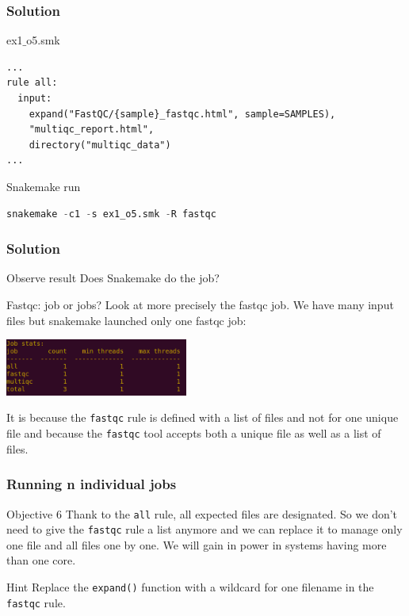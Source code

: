 \begin{frame}[containsverbatim]
\frametitle{Solution}
\begin{exampleblock}{ex1$\_$o5.smk}
\begin{lstlisting}
...
rule all:
  input:
    expand("FastQC/{sample}_fastqc.html", sample=SAMPLES),
    "multiqc_report.html",
    directory("multiqc_data")
...
\end{lstlisting}
\end{exampleblock}
\begin{exampleblock}{Snakemake run}
\begin{lstlisting}[language=python]
snakemake -c1 -s ex1_o5.smk -R fastqc
\end{lstlisting}
\end{exampleblock}
\end{frame}
\begin{frame}[containsverbatim]
\frametitle{Solution}
\begin{exampleblock}{Observe result}
Does Snakemake do the job?\\
\end{exampleblock}
\begin{exampleblock}{Fastqc: job or jobs?}
Look at more precisely the fastqc job. We have many input files but snakemake launched only one fastqc job:
\begin{center}
    \includegraphics[width=6cm]{03_workflow/images/FAIR_ex1_o5_smk.png}
\end{center}
It is because the \verb|fastqc| rule is defined with a list of files and not for one unique file and because the \verb|fastqc| tool accepts both a unique file as well as a list of files.
\end{exampleblock}
\end{frame}
\begin{frame}[containsverbatim]
\frametitle{Running n individual jobs}
\begin{exampleblock}{Objective 6}
Thank to the \verb|all| rule, all expected files are designated. So we don't need to give the \verb|fastqc| rule a list anymore and we can replace it to manage only one file and all files one by one. We will gain in power in systems having more than one core.
\end{exampleblock}
\begin{exampleblock}{Hint}
Replace the \verb|expand()| function with a wildcard for one filename in the \verb|fastqc| rule.
\end{exampleblock}
\end{frame}

